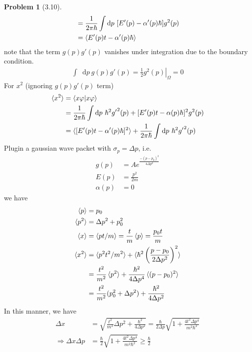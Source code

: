 \documentclass[twoside,11pt]{article}
\renewcommand*\d{\mathop{}\!\mathrm{d}}
\theoremstyle{definition}
\newtheorem{problem}{Problem}
\theoremstyle{remark}
\begin{document}
\begin{problem}[3.10]
\begin{align*}
        &= \frac{1}{2\pi\hbar}\int\d p\ [E'(p)-\alpha'(p)\hbar] g^2(p)\\
        &= \braket{E'(p)t-\alpha'(p)\hbar}
    \end{align*}
    note that the term $g(p)g'(p)$ vanishes under integration due to the boundary condition.
    \begin{align*}
        \int\d p\ g(p)g'(p) = \left. \frac{1}{2}g^2(p)\right |_\Omega = 0
    \end{align*}
    For $x^2$ (ignoring $g(p)g'(p)$ term)
    \begin{align*}
        \braket{x^2} &= \braket{x\varphi|x\varphi}\\
        &= \frac{1}{2\pi\hbar}\int\d p\ \hbar^2 {g'}^2(p) + [E'(p)t-\alpha(p)\hbar]^2 g^2(p)\\
        &= \braket{[E'(p)t-\alpha'(p)\hbar]^2} + \frac{1}{2\pi\hbar}\int\d p\ 
        \hbar^2 {g'}^2(p)
    \end{align*}
    Plugin a gaussian wave packet with $\sigma_p=\Delta p$, i.e.
    \begin{align*}
        g(p) &= Ae^{\frac{-(p-p_0)^2}{4\Delta p^2}}\\
        E(p) &= \frac{p^2}{2m}\\
        \alpha(p) &= 0
    \end{align*}
    we have
    \begin{align*}
        \braket{p} &= p_0\\
        \braket{p^2} &= \Delta p^2 + p_0^2\\
        \braket{x} &= \braket{pt/m} = \frac{t}{m}\braket{p} = \frac{p_0t}{m}\\
        \braket{x^2} &= \braket{p^2t^2/m^2} +
        \braket{\hbar^2\left(\frac{p-p_0}{2\Delta p^2}\right)^2}\\
        &= \frac{t^2}{m^2}\braket{p^2} + \frac{\hbar^2}{4\Delta p^4}\braket{(p-p_0)^2}\\
        &= \frac{t^2}{m^2}(p_0^2 + \Delta p^2) + \frac{\hbar^2}{4\Delta p^2}
    \end{align*}
    In this manner, we have
    \begin{align*}
        \Delta x &= \sqrt{\frac{t^2}{m^2}\Delta p^2 + \frac{\hbar^2}{4\Delta p^2}}
        = \frac{\hbar}{2\Delta p}\sqrt{1 + \frac{4t^2\Delta p^4}{m^2\hbar^2}}\\
        \Rightarrow
        \Delta x\Delta p &= 
        \frac{\hbar}{2}\sqrt{1 + \frac{4t^2\Delta p^4}{m^2\hbar^2}}\geq \frac{\hbar}{2}
    \end{align*}
\end{problem}
\end{document}
